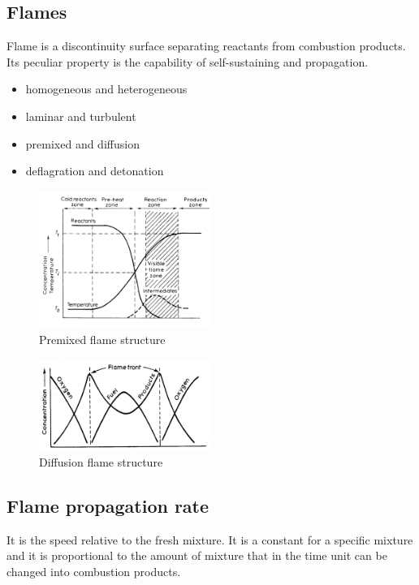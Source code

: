 \documentclass[12pt]{article}
\begin{document}
\subsection{Flames}

Flame is a discontinuity surface separating reactants from combustion products. Its peculiar property is the capability of self-sustaining and propagation.

\begin{itemize}
    \item homogeneous and heterogeneous
    \item laminar and turbulent
    \item premixed and diffusion
    \item deflagration and detonation
\end{itemize}

\begin{figure}[h!]
\centering
\includegraphics[width=0.5\textwidth]{figures/premixed_structure.png}
\caption{Premixed flame structure}
\end{figure}

\begin{figure}[h!]
\centering
\includegraphics[width=0.5\textwidth]{figures/diffusion_structure.png}
\caption{Diffusion flame structure}
\end{figure}

\subsection{Flame propagation rate}

It is the speed relative to the fresh mixture. It is a constant for a specific mixture and it is proportional to the amount of mixture that in the time unit can be changed into combustion products.
\end{document}
